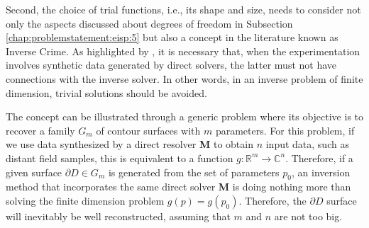			Second, the choice of trial functions, i.e., its shape and size, needs to consider not only the aspects discussed about degrees of freedom in Subsection \ref{chap:problemstatement:eisp:5} but also a concept in the literature known as Inverse Crime. As highlighted by \cite{colton2019inverse}, it is necessary that, when the experimentation involves synthetic data generated by direct solvers, the latter must not have connections with the inverse solver. In other words, in an inverse problem of finite dimension, trivial solutions should be avoided.
			
			The concept can be illustrated through a generic problem where its objective is to recover a family $G_m$ of contour surfaces with $m$ parameters. For this problem, if we use data synthesized by a direct resolver \textbf{M} to obtain $n$ input data, such as distant field samples, this is equivalent to a function $g : \mathbb{R}^m \rightarrow \mathbb{C}^n$. Therefore, if a given surface $\partial D\in G_m$ is generated from the set of parameters $p_0$, an inversion method that incorporates the same direct solver \textbf{M} is doing nothing more than solving the finite dimension problem $g(p) = g(p_0)$. Therefore, the $\partial D$ surface will inevitably be well reconstructed, assuming that $m$ and $n$ are not too big.
			
